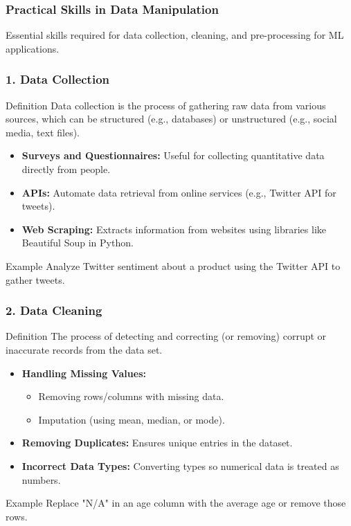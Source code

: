 \documentclass[aspectratio=169]{beamer}
\begin{document}
\begin{frame}[fragile]
    \frametitle{Practical Skills in Data Manipulation}
    Essential skills required for data collection, cleaning, and pre-processing for ML applications.
\end{frame}

\begin{frame}[fragile]
    \frametitle{1. Data Collection}
    
    \begin{block}{Definition}
        Data collection is the process of gathering raw data from various sources, which can be structured (e.g., databases) or unstructured (e.g., social media, text files).
    \end{block}
    
    \begin{itemize}
        \item \textbf{Surveys and Questionnaires:} Useful for collecting quantitative data directly from people.
        \item \textbf{APIs:} Automate data retrieval from online services (e.g., Twitter API for tweets).
        \item \textbf{Web Scraping:} Extracts information from websites using libraries like Beautiful Soup in Python.
    \end{itemize}

    \begin{block}{Example}
        Analyze Twitter sentiment about a product using the Twitter API to gather tweets.
    \end{block}
\end{frame}

\begin{frame}[fragile]
    \frametitle{2. Data Cleaning}

    \begin{block}{Definition}
        The process of detecting and correcting (or removing) corrupt or inaccurate records from the data set.
    \end{block}
    
    \begin{itemize}
        \item \textbf{Handling Missing Values:}
            \begin{itemize}
                \item Removing rows/columns with missing data.
                \item Imputation (using mean, median, or mode).
            \end{itemize}
        \item \textbf{Removing Duplicates:} Ensures unique entries in the dataset.
        \item \textbf{Incorrect Data Types:} Converting types so numerical data is treated as numbers.
    \end{itemize}

    \begin{block}{Example}
        Replace "N/A" in an age column with the average age or remove those rows.
    \end{block}
\end{frame}
\end{document}
